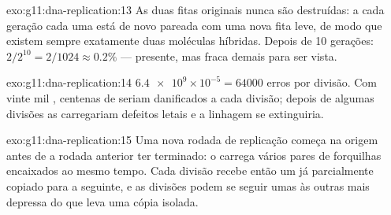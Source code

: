 \begin{solution}{exo:g11:dna-replication:13}
As duas fitas originais nunca são destruídas: a cada geração cada uma
está de novo pareada com uma nova fita leve, de modo que existem sempre
exatamente duas moléculas híbridas. Depois de 10 gerações:
$2/2^{10} = 2/1024
\approx 0.2\%$ --- presente, mas fraca demais para ser vista.
\end{solution}

\begin{solution}{exo:g11:dna-replication:14}
$\num{6.4e9} \times 10^{-5} = \num{64000}$ erros por divisão. Com vinte
mil , centenas de  seriam danificados a cada divisão; depois
de algumas divisões as  carregariam defeitos letais e a linhagem
se extinguiria.
\end{solution}

\begin{solution}{exo:g11:dna-replication:15}
Uma nova rodada de replicação começa na origem antes de a rodada
anterior ter terminado: o  carrega vários pares de forquilhas
encaixados ao mesmo tempo. Cada divisão recebe então um  já
parcialmente copiado para a seguinte, e as divisões podem se seguir
umas às outras mais depressa do que leva uma cópia isolada.
\end{solution}

